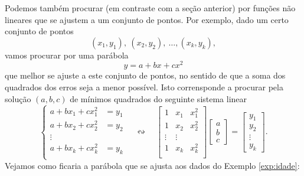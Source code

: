 \documentclass[../livro.tex]{subfiles}  %
\begin{document}
Podemos também procurar (em contraste com a seção anterior) por funções não lineares que se ajustem a um conjunto de pontos. Por exemplo, dado um certo conjunto de pontos
\[
(x_1, y_1), \ (x_2, y_2), \ \dots, (x_k, y_k),
\] vamos procurar por uma parábola
\[
y = a + bx + cx^2
\] que melhor se ajuste a este conjunto de pontos, no sentido de que a soma dos quadrados dos erros seja a menor possível. Isto corrensponde a procurar pela solução $(a,b, c)$ de mínimos quadrados do seguinte sistema linear
\[
\left\{
  \begin{array}{rl}
    a + b x_1 + c x_1^2 &\!\!\!\!\!= y_1  \\
    a + b x_2 + c x_2^2 &\!\!\!\!\!= y_2  \\
    \vdots &  \\
    a + b x_k + c x_k^2 &\!\!\!\!\!= y_k  \\
  \end{array}
\right. \quad \leftrightsquigarrow  \quad
\begin{bmatrix}
  1 & x_1 & x_1^2 \\
  1 & x_2 & x_2^2 \\
  \vdots & \vdots \\
  1 & x_k & x_k^2 \\
\end{bmatrix}
\begin{bmatrix}
  a \\ b \\ c
\end{bmatrix} =
\begin{bmatrix}
  y_1 \\ y_2 \\ \vdots \\ y_k
\end{bmatrix}.
\] Vejamos como ficaria a parábola que se ajusta aos dados do Exemplo \ref{exp:idade}:
\end{document}
